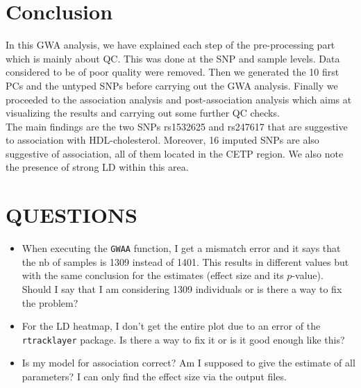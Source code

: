 \documentclass[a4paper, 12pt]{article}
\begin{document}
\section{Conclusion}

In this GWA analysis, we have explained each step of the pre-processing part which is mainly about QC. This was done at the SNP and sample levels. Data considered to be of poor quality were removed. Then we generated the 10 first PCs and the untyped SNPs before carrying out the GWA analysis. Finally we proceeded to the association analysis and post-association analysis which aims at visualizing the results and carrying out some further QC checks. \\

The main findings are the two SNPs rs1532625 and rs247617 that are suggestive to association with HDL-cholesterol. Moreover, 16 imputed SNPs are also suggestive of association, all of them located in the CETP region. We also note the presence of strong LD within this area.

\nocite{*}



\newpage

\section{QUESTIONS}

\begin{itemize}
\item When executing the \texttt{GWAA} function, I get a mismatch error and it says that the nb of samples is 1309 instead of 1401. This results in different values but with the same conclusion for the estimates (effect size and its $p$-value). Should I say that I am considering 1309 individuals or is there a way to fix the problem? \vspace{\baselineskip}
\item For the LD heatmap, I don't get the entire plot due to an error of the \texttt{rtracklayer} package. Is there a way to fix it or is it good enough like this? \vspace{\baselineskip}
\item Is my model for association correct? Am I supposed to give the estimate of all parameters? I can only find the effect size via the output files.
\end{itemize}


\end{document}
